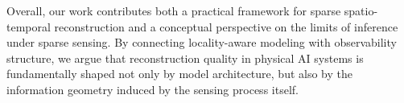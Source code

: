 Overall, our work contributes both a practical framework for sparse spatio-temporal reconstruction and a conceptual perspective on the limits of inference under sparse sensing. By connecting locality-aware modeling with observability structure, we argue that reconstruction quality in physical AI systems is fundamentally shaped not only by model architecture, but also by the information geometry induced by the sensing process itself.
